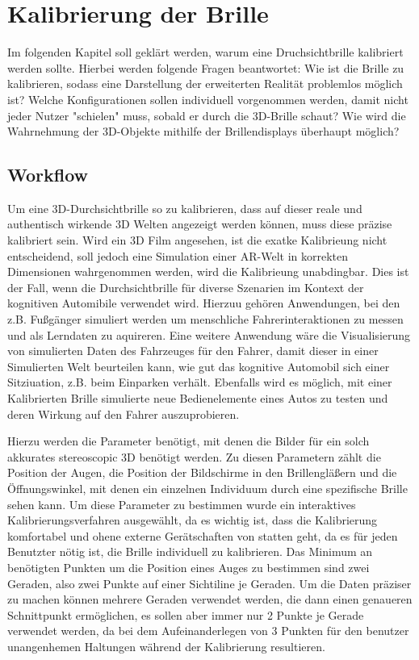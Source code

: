 \section{Kalibrierung der Brille}
Im folgenden Kapitel soll geklärt werden, warum eine Druchsichtbrille kalibriert werden sollte. Hierbei werden folgende Fragen beantwortet: Wie ist die Brille zu kalibrieren, sodass eine Darstellung der erweiterten Realität problemlos möglich ist? Welche Konfigurationen sollen individuell vorgenommen werden, damit nicht jeder Nutzer "schielen" muss, sobald er durch die 3D-Brille schaut? Wie wird die Wahrnehmung der 3D-Objekte mithilfe der Brillendisplays überhaupt möglich?

\subsection{Workflow}
Um eine 3D-Durchsichtbrille so zu kalibrieren, dass auf dieser reale und authentisch wirkende 3D Welten angezeigt werden können, muss diese präzise kalibriert sein. Wird ein 3D Film angesehen, ist die exatke Kalibrieung nicht entscheidend, soll jedoch eine Simulation einer AR-Welt in korrekten Dimensionen wahrgenommen werden, wird die Kalibrieung unabdingbar. Dies ist der Fall, wenn die Durchsichtbrille für diverse Szenarien im Kontext der kognitiven Automibile verwendet wird. Hierzuu gehören Anwendungen, bei den z.B. Fußgänger simuliert werden um menschliche Fahrerinteraktionen zu messen und als Lerndaten zu aquireren. Eine weitere Anwendung wäre die Visualisierung von simulierten Daten des Fahrzeuges für den Fahrer, damit dieser in einer Simulierten Welt beurteilen kann, wie gut das kognitive Automobil sich einer Sitziuation, z.B. beim Einparken verhält. Ebenfalls wird es möglich, mit einer Kalibrierten Brille simulierte neue Bedienelemente eines Autos zu testen und deren Wirkung auf den Fahrer auszuprobieren.

Hierzu werden die Parameter benötigt, mit denen die Bilder für ein solch akkurates stereoscopic 3D benötigt werden. Zu diesen Parametern zählt die Position der Augen, die Position der Bildschirme in den Brillengläßern und die Öffnungswinkel, mit denen ein einzelnen Individuum durch eine spezifische Brille sehen kann. Um diese Parameter zu bestimmen wurde ein interaktives Kalibrierungsverfahren ausgewählt, da es wichtig ist, dass die Kalibrierung komfortabel und ohene externe Gerätschaften von statten geht, da es für jeden Benutzter nötig ist, die Brille individuell zu kalibrieren. Das Minimum an benötigten Punkten um die Position eines Auges zu bestimmen sind zwei Geraden, also zwei Punkte auf einer Sichtiline je Geraden. Um die Daten präziser zu machen können mehrere Geraden verwendet werden, die dann einen genaueren Schnittpunkt ermöglichen, es sollen aber immer nur 2 Punkte je Gerade verwendet werden, da bei dem Aufeinanderlegen von 3 Punkten für den benutzer unangenhemen Haltungen während der Kalibrierung resultieren.

